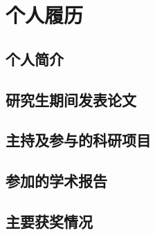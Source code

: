 
\cleardoublepage
{}
{}

\chapter*{个人履历}

\specialsectioning
\section{个人简介}

\specialsectioning
\section{研究生期间发表论文}

\specialsectioning
\section{主持及参与的科研项目}

\specialsectioning
\section{参加的学术报告}

\specialsectioning
\section{主要获奖情况}
